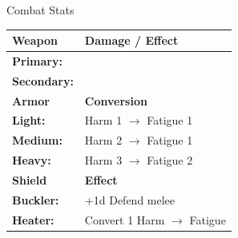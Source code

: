 \documentclass[10pt]{article}
\begin{document}
\begin{minipage}[t]{0.48\linewidth}
    \vspace{0.5em}
    
    \begin{charbox}{Combat Stats}
        \begin{tabular}{>{\bfseries}p{3cm} p{4.5cm}}
            \toprule
            \textbf{Weapon} & \textbf{Damage / Effect} \\
            \midrule
            Primary: & \underline{\hspace{4cm}} \\
            Secondary: & \underline{\hspace{4cm}} \\
            \midrule
            \textbf{Armor} & \textbf{Conversion} \\
            Light: & Harm 1 $\rightarrow$ Fatigue 1 \\
            Medium: & Harm 2 $\rightarrow$ Fatigue 1 \\
            Heavy: & Harm 3 $\rightarrow$ Fatigue 2 \\
            \midrule
            \textbf{Shield} & \textbf{Effect} \\
            Buckler: & +1d Defend melee \\
            Heater: & Convert 1 Harm $\rightarrow$ Fatigue \\
            \bottomrule
        \end{tabular}
    \end{charbox}
\end{minipage}
\hfill
\end{document}
